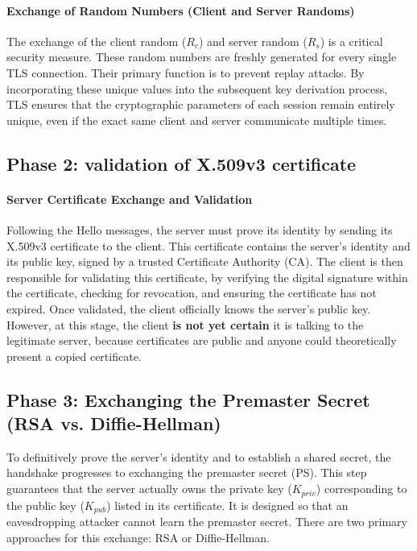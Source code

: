 \paragraph{Exchange of Random Numbers (Client and Server Randoms)}
The exchange of the client random ($R_c$) and server random ($R_s$) is a critical security measure. These random numbers are freshly generated for every single TLS connection. Their primary function is to prevent replay attacks. By incorporating these unique values into the subsequent key derivation process, TLS ensures that the cryptographic parameters of each session remain entirely unique, even if the exact same client and server communicate multiple times.


\subsection{Phase 2: validation of X.509v3 certificate}

\paragraph{Server Certificate Exchange and Validation}
Following the Hello messages, the server must prove its identity by sending its X.509v3 certificate to the client. This certificate contains the server's identity and its public key, signed by a trusted Certificate Authority (CA).
The client is then responsible for validating this certificate, by verifying the digital signature within the certificate, checking for revocation, and ensuring the certificate has not expired. Once validated, the client officially knows the server's public key. However, at this stage, the client \textbf{is not yet certain} it is talking to the legitimate server, because certificates are public and anyone could theoretically present a copied certificate.


\subsection{Phase 3: Exchanging the Premaster Secret (RSA vs. Diffie-Hellman)}
To definitively prove the server's identity and to establish a shared secret, the handshake progresses to exchanging the premaster secret (PS). This step guarantees that the server actually owns the private key ($K_{priv}$) corresponding to the public key ($K_{pub}$) listed in its certificate. It is designed so that an eavesdropping attacker cannot learn the premaster secret. There are two primary approaches for this exchange: RSA or Diffie-Hellman.

